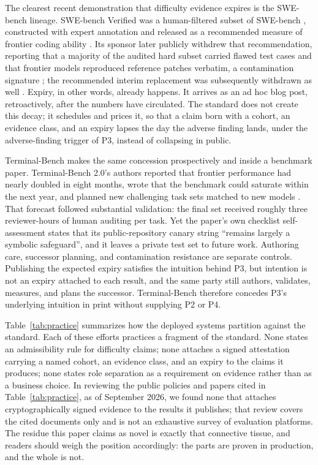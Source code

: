 \documentclass[11pt]{article}
\begin{document}
The clearest recent demonstration that difficulty evidence expires is the SWE-bench lineage. SWE-bench Verified was a human-filtered subset of SWE-bench \citep{jimenez2024swebench}, constructed with expert annotation and released as a recommended measure of frontier coding ability \citep{openai2024swebenchverified}. Its sponsor later publicly withdrew that recommendation, reporting that a majority of the audited hard subset carried flawed test cases and that frontier models reproduced reference patches verbatim, a contamination signature \citep{openai2026retraction}; the recommended interim replacement was subsequently withdrawn as well \citep{openai2026signal}. Expiry, in other words, already happens. It arrives as an ad hoc blog post, retroactively, after the numbers have circulated. The standard does not create this decay; it schedules and prices it, so that a claim born with a cohort, an evidence class, and an expiry lapses the day the adverse finding lands, under the adverse-finding trigger of P3, instead of collapsing in public.

Terminal-Bench makes the same concession prospectively and inside a benchmark paper. Terminal-Bench 2.0's authors reported that frontier performance had nearly doubled in eight months, wrote that the benchmark could saturate within the next year, and planned new challenging task sets matched to new models \citep{merrill2026terminalbench}. That forecast followed substantial validation: the final set received roughly three reviewer-hours of human auditing per task. Yet the paper's own checklist self-assessment states that its public-repository canary string ``remains largely a symbolic safeguard'', and it leaves a private test set to future work. Authoring care, successor planning, and contamination resistance are separate controls. Publishing the expected expiry satisfies the intuition behind P3, but intention is not an expiry attached to each result, and the same party still authors, validates, measures, and plans the successor. Terminal-Bench therefore concedes P3's underlying intuition in print without supplying P2 or P4.

Table~\ref{tab:practice} summarizes how the deployed systems partition against the standard. Each of these efforts practices a fragment of the standard. None states an admissibility rule for difficulty claims; none attaches a signed attestation carrying a named cohort, an evidence class, and an expiry to the claims it produces; none states role separation as a requirement on evidence rather than as a business choice. In reviewing the public policies and papers cited in Table~\ref{tab:practice}, as of September 2026, we found none that attaches cryptographically signed evidence to the results it publishes; that review covers the cited documents only and is not an exhaustive survey of evaluation platforms. The residue this paper claims as novel is exactly that connective tissue, and readers should weigh the position accordingly: the parts are proven in production, and the whole is not.
\end{document}
